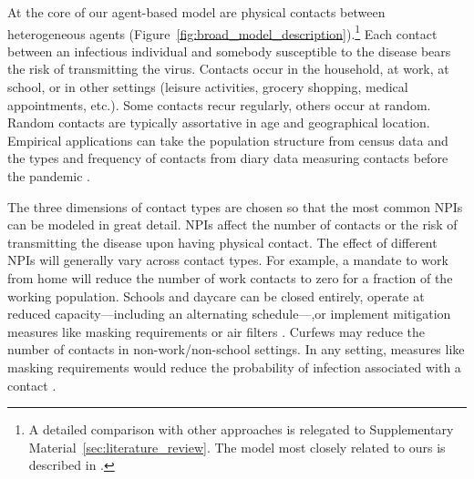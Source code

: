 At the core of our agent-based model are physical contacts between heterogeneous agents
(Figure~\ref{fig:broad_model_description}).\footnote{A detailed comparison with other
approaches  is relegated to Supplementary Material~\ref{sec:literature_review}. The
model most closely related to ours is described in \citet{Hinch2020}.} Each contact
between an infectious individual and somebody susceptible to the disease bears the risk
of transmitting the virus. Contacts occur in the household, at work, at school, or in
other settings (leisure activities, grocery shopping, medical appointments, etc.). Some
contacts recur regularly, others occur at random. Random contacts are typically
assortative in age and geographical location. Empirical applications can take the
population structure from census data and the types and frequency of contacts from diary
data measuring contacts before the pandemic \citep[e.g.][]{Mossong2008,Hoang2019}.

The three dimensions of contact types are chosen so that the most common NPIs can be
modeled in great detail. NPIs affect the number of contacts or the risk of transmitting
the disease upon having physical contact. The effect of different NPIs will generally
vary across contact types. For example, a mandate to work from home will reduce the
number of work contacts to zero for a fraction of the working population. Schools and
daycare can be closed entirely, operate at reduced capacity---including an alternating
schedule---,or implement mitigation measures like masking requirements or air filters
\citep{Lessler2021}. Curfews may reduce the number of contacts in non-work/non-school
settings. In any setting, measures like masking requirements would reduce the
probability of infection associated with a contact \citep{Cheng2021}.


